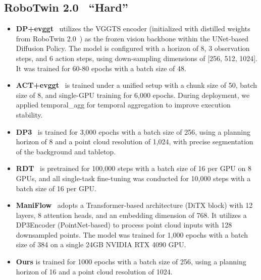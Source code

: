 \documentclass[runningheads]{llncs}
\begin{document}
\subsection{RoboTwin 2.0~\cite{chen2025robotwin} ``Hard''}
\begin{itemize}
    \item \textbf{DP+evggt}~\cite{vuong2025improvingroboticmanipulationefficient} utilizes the VGGTS encoder (initialized with distilled weights from RoboTwin 2.0~\cite{chen2025robotwin}) as the frozen vision backbone within the UNet-based Diffusion Policy. The model is configured with a horizon of 8, 3 observation steps, and 6 action steps, using down-sampling dimensions of [256, 512, 1024]. It was trained for 60-80 epochs with a batch size of 48.
    \item \textbf{ACT+evggt}~\cite{vuong2025improvingroboticmanipulationefficient} is trained under a unified setup with a chunk size of 50, batch size of 8, and single-GPU training for 6,000 epochs. During deployment, we applied temporal\_agg for temporal aggregation to improve execution stability.
    \item \textbf{DP3}~\cite{ze20243d} is trained for 3,000 epochs with a batch size of 256, using a planning horizon of 8 and a point cloud resolution of 1,024, with precise segmentation of the background and tabletop.
    \item \textbf{RDT}~\cite{liu2025rdt1bdiffusionfoundationmodel} is pretrained for 100,000 steps with a batch size of 16 per GPU on 8 GPUs, and all single-task fine-tuning was conducted for 10,000 steps with a batch size of 16 per GPU.
    \item \textbf{ManiFlow}~\cite{yan2025maniflowgeneralrobotmanipulation} adopts a Transformer-based architecture (DiTX block) with 12 layers, 8 attention heads, and an embedding dimension of 768. It utilizes a DP3Encoder (PointNet-based) to process point cloud inputs with 128 downsampled points. The model was trained for 1,000 epochs with a batch size of 384 on a single 24GB NVIDIA RTX 4090 GPU. 
    \item \textbf{Ours} is trained for 1000 epochs with a batch size of 256, using a planning horizon of 16 and a point cloud resolution of 1024.
\end{itemize}
\end{document}
